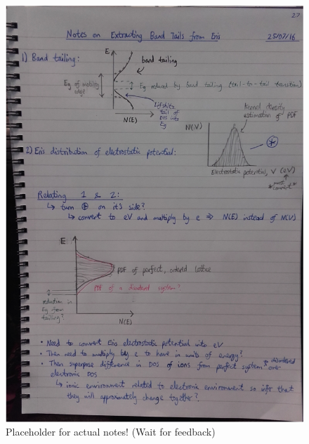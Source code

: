 \begin{figure}[h!]
  \centering
    \includegraphics[width=1.0\textwidth]{figures/band_tails_notes.png}
    \caption{Placeholder for actual notes! (Wait for feedback)}
  \label{band_tail_notes}
\end{figure}


